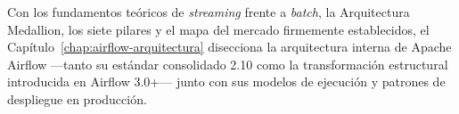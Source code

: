 Con los fundamentos teóricos de \textit{streaming} frente a \textit{batch}, la Arquitectura Medallion, los siete pilares y el mapa del mercado firmemente establecidos, el Capítulo~\ref{chap:airflow-arquitectura} disecciona la arquitectura interna de Apache Airflow ---tanto su estándar consolidado 2.10 como la transformación estructural introducida en Airflow 3.0+--- junto con sus modelos de ejecución y patrones de despliegue en producción.
